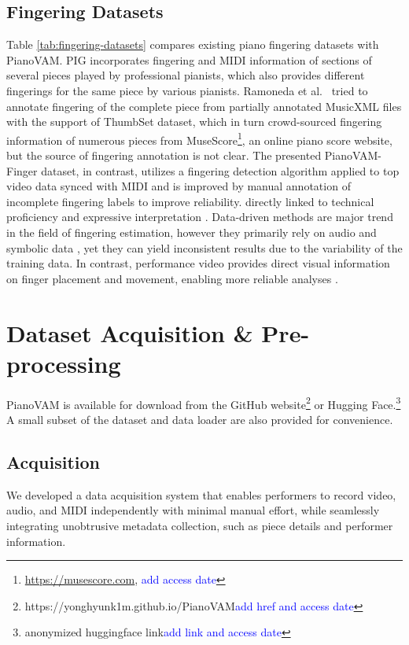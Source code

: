 \documentclass{article}
\newcommand{\alex}[1]{\textcolor{blue}{#1}}%
\begin{document}
\subsection{Fingering Datasets}
Table \ref{tab:fingering-datasets} compares existing piano fingering datasets with PianoVAM. PIG \cite{InfoSci20Nakamura} incorporates fingering and MIDI information of sections of several pieces played by professional pianists, which also provides different fingerings for the same piece by various pianists. Ramoneda et al.\ \cite{MM22Ramoneda} tried to annotate fingering of the complete piece from partially annotated MusicXML files with the support of ThumbSet dataset, which in turn crowd-sourced fingering information of numerous pieces from MuseScore\footnote{\href{https://musescore.com}{https://musescore.com}, \alex{add access date}}, an online piano score website, but the source of fingering annotation is not clear. The presented PianoVAM-Finger dataset, in contrast, utilizes a fingering detection algorithm  applied to top video data synced with MIDI and is improved by manual annotation of incomplete fingering labels to improve reliability.  directly linked to technical proficiency and expressive interpretation \cite{Piano21Telles}. Data-driven methods are major trend in the field of fingering estimation, however they primarily rely on audio and symbolic data \cite{IEAAIE10Maezawa, InfoSci20Nakamura, MM22Ramoneda}, yet they can yield inconsistent results due to the variability of the training data. In contrast, performance video provides direct visual information on finger placement and movement, enabling more reliable analyses \cite{MM07Zhang}. 


\section{Dataset Acquisition \& Pre-processing}\label{sec:dataset-acquisition-preprocessing}
PianoVAM is available for download from the GitHub website\footnote{https://yonghyunk1m.github.io/PianoVAM\label{github-link}\alex{add href and access date}} or Hugging Face.\footnote{anonymized huggingface link\alex{add link and access date}} A small subset of the dataset and data loader are also provided for convenience.

\subsection{Acquisition}
We developed a data acquisition system that enables performers to record video, audio, and MIDI independently with minimal manual effort, while seamlessly integrating unobtrusive metadata collection, such as piece details and performer information.  
 
\end{document}
